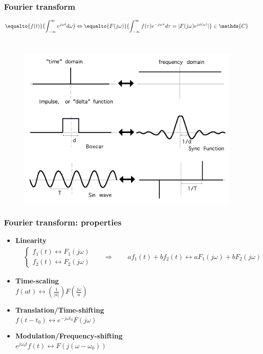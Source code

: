 \begin{frame}
	\frametitle{Fourier transform}
	\vspace{-2ex}
	\large{\[
	\equalto{f(t)}{\int_{-\infty}^{\infty} e^{j\omega t} d\omega} \Leftrightarrow \equalto{F(j\omega)}{\int_{-\infty}^{\infty} f(\tau) e^{-j \omega \tau} d \tau = |F(j \omega) e^{j \phi(\omega)}|} \in \mathds{C}
	\]}\\
	\begin{figure}
		\includegraphics[width=0.6\linewidth]{fourier_examples}
	\end{figure}
\end{frame}

\begin{frame}
	\frametitle{Fourier transform: properties}
	\begin{itemize}
		\item \textbf{Linearity} \\
		\vspace{-3ex}
		\begin{align*}
		& \begin{cases}
		f_1(t) \leftrightarrow F_1(j\omega)\\
		f_2(t) \leftrightarrow F_2(j\omega)
		\end{cases} && \Rightarrow \qquad a f_1(t) + b f_2(t) \leftrightarrow a F_1(j\omega) + b F_2(j \omega)
		\end{align*}
		\item \textbf{Time-scaling} \\
		\medskip
		$f(a t) \leftrightarrow (\frac{1}{|a|}) F(\frac{j \omega}{a})$
		\medskip
		\item \textbf{Translation/Time-shifting} \\
		\medskip
		$f (t - t_0) \leftrightarrow e^{-j \omega t_0} F(j\omega)$
		\medskip
		\item \textbf{Modulation/Frequency-shifting} \\
		\medskip
		$e^{j \omega_0 t} f(t) \leftrightarrow F(j (\omega - \omega_0))$
	\end{itemize}
\end{frame}

